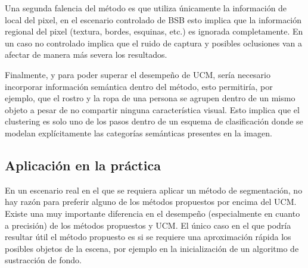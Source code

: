 \documentclass[10pt,twocolumn,letterpaper]{article}
\begin{document}
Una segunda falencia del método es que utiliza únicamente la información de local del pixel, en el escenario controlado de BSB esto implica que la información regional del pixel (textura, bordes, esquinas, etc.) es ignorada completamente. En un caso no controlado implica que el ruido de captura y posibles oclusiones van a afectar de manera más severa los resultados.

Finalmente, y para poder superar el desempeño de UCM, sería necesario incorporar información semántica dentro del método, esto permitiría, por ejemplo, que  el rostro y la ropa de una persona se agrupen dentro de un mismo objeto a pesar de no compartir ninguna característica visual. Esto implica que el clustering es solo uno de los pasos dentro de un esquema de clasificación donde se modelan explícitamente las categorías semánticas presentes en la imagen.


\subsection{Aplicación en la práctica}
En un escenario real en el que se requiera aplicar un método de segmentación, no hay razón para preferir alguno de los métodos propuestos por encima del UCM. Existe una muy importante diferencia en el desempeño (especialmente en cuanto a precisión) de los métodos propuestos y UCM. El único caso en el que podría resultar útil el método propuesto es si se requiere una aproximación rápida los posibles objetos de la escena, por ejemplo en la inicialización de un algoritmo de sustracción de fondo.


{\small


}
\end{document}
